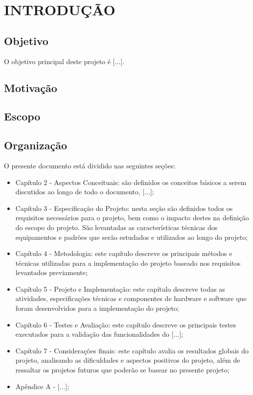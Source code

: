 \chapter{INTRODUÇÃO}

\section{Objetivo}

O objetivo principal deste projeto é [...].

\section{Motivação}


\section{Escopo}


\section{Organização}

O presente documento está dividido nas seguintes seções:

\begin{itemize}

  \item Capítulo 2 - Aspectos Conceituais: são definidos os conceitos básicos a serem discutidos ao longo de todo o documento, [...];

  \item Capítulo 3 - Especificação do Projeto: nesta seção são definidos todos os requisitos necessários para o projeto, bem como o impacto destes na definição do escopo do projeto. São levantadas as características técnicas dos equipamentos e padrões que serão estudados e utilizados ao longo do projeto;

  \item Capítulo 4 - Metodologia: este capítulo descreve os principais métodos e técnicas utilizadas para a implementação do projeto baseado nos requisitos levantados previamente;

  \item Capítulo 5 - Projeto e Implementação: este capítulo descreve todas as atividades, especificações técnicas e componentes de hardware e software que foram desenvolvidos para a implementação do projeto;

  \item Capítulo 6 - Testes e Avaliação: este capítulo descreve os principais testes executados para a validação das funcionalidades do [...];

  \item Capítulo 7 - Considerações finais: este capítulo avalia os resultados globais do projeto, analisando as dificuldades e aspectos positivos do projeto, além de ressaltar os projetos futuros que poderão se basear no presente projeto;

  \item Apêndice A - [...];

\end{itemize}
